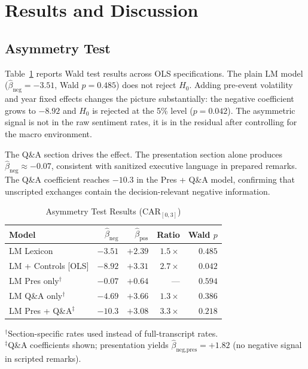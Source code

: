 \documentclass[conference]{IEEEtran}
\begin{document}
\section{Results and Discussion}
\label{sec:results}

\subsection{Asymmetry Test}

Table~\ref{tab:asymmetry} reports Wald test results across OLS specifications.
The plain LM model ($\hat\beta_{\text{neg}} = -3.51$, Wald $p = 0.485$)
does not reject $H_0$. Adding pre-event volatility and year fixed effects
changes the picture substantially: the negative coefficient grows to $-8.92$
and $H_0$ is rejected at the 5\% level ($p = 0.042$). The asymmetric signal
is not in the raw sentiment rates, it is in the residual after controlling
for the macro environment.

The Q\&A section drives the effect. The presentation section alone produces
$\hat\beta_{\text{neg}} \approx -0.07$, consistent with sanitized executive
language in prepared remarks. The Q\&A coefficient reaches $-10.3$ in the
Pres + Q\&A model, confirming that unscripted exchanges contain the
decision-relevant negative information.

\begin{table}[htbp]
\caption{Asymmetry Test Results (CAR$_{[0,3]}$)}
\label{tab:asymmetry}
\centering
\begin{tabular}{lrrrr}
\toprule
Model & $\hat\beta_{\text{neg}}$ & $\hat\beta_{\text{pos}}$ & Ratio & Wald $p$ \\
\midrule
LM Lexicon               & $-3.51$ & $+2.39$ & $1.5\times$ & $0.485$ \\
LM + Controls [OLS]      & $-8.92$ & $+3.31$ & $2.7\times$ & $\mathbf{0.042}$ \\
LM Pres only$^\dagger$   & $-0.07$ & $+0.64$ & ---         & $0.594$ \\
LM Q\&A only$^\dagger$   & $-4.69$ & $+3.66$ & $1.3\times$ & $0.386$ \\
LM Pres + Q\&A$^\ddagger$ & $-10.3$ & $+3.08$ & $3.3\times$ & $0.218$ \\
\bottomrule
\end{tabular}
{\footnotesize
$^\dagger$Section-specific rates used instead of full-transcript rates.\\
$^\ddagger$Q\&A coefficients shown; presentation yields
$\hat\beta_{\text{neg,pres}} = +1.82$ (no negative signal in scripted remarks).}
\end{table}
\end{document}
